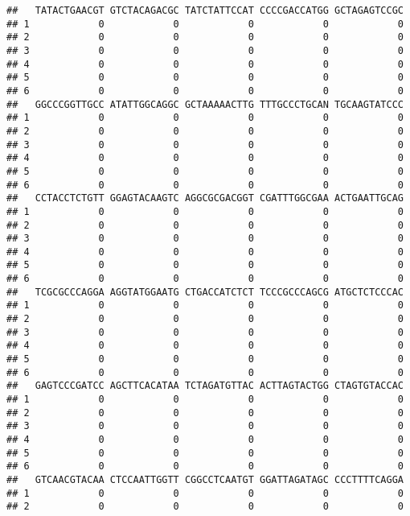 \documentclass[]{article}
\begin{document}
\begin{verbatim}
##   TATACTGAACGT GTCTACAGACGC TATCTATTCCAT CCCCGACCATGG GCTAGAGTCCGC
## 1            0            0            0            0            0
## 2            0            0            0            0            0
## 3            0            0            0            0            0
## 4            0            0            0            0            0
## 5            0            0            0            0            0
## 6            0            0            0            0            0
##   GGCCCGGTTGCC ATATTGGCAGGC GCTAAAAACTTG TTTGCCCTGCAN TGCAAGTATCCC
## 1            0            0            0            0            0
## 2            0            0            0            0            0
## 3            0            0            0            0            0
## 4            0            0            0            0            0
## 5            0            0            0            0            0
## 6            0            0            0            0            0
##   CCTACCTCTGTT GGAGTACAAGTC AGGCGCGACGGT CGATTTGGCGAA ACTGAATTGCAG
## 1            0            0            0            0            0
## 2            0            0            0            0            0
## 3            0            0            0            0            0
## 4            0            0            0            0            0
## 5            0            0            0            0            0
## 6            0            0            0            0            0
##   TCGCGCCCAGGA AGGTATGGAATG CTGACCATCTCT TCCCGCCCAGCG ATGCTCTCCCAC
## 1            0            0            0            0            0
## 2            0            0            0            0            0
## 3            0            0            0            0            0
## 4            0            0            0            0            0
## 5            0            0            0            0            0
## 6            0            0            0            0            0
##   GAGTCCCGATCC AGCTTCACATAA TCTAGATGTTAC ACTTAGTACTGG CTAGTGTACCAC
## 1            0            0            0            0            0
## 2            0            0            0            0            0
## 3            0            0            0            0            0
## 4            0            0            0            0            0
## 5            0            0            0            0            0
## 6            0            0            0            0            0
##   GTCAACGTACAA CTCCAATTGGTT CGGCCTCAATGT GGATTAGATAGC CCCTTTTCAGGA
## 1            0            0            0            0            0
## 2            0            0            0            0            0

\end{verbatim}
\end{document}
